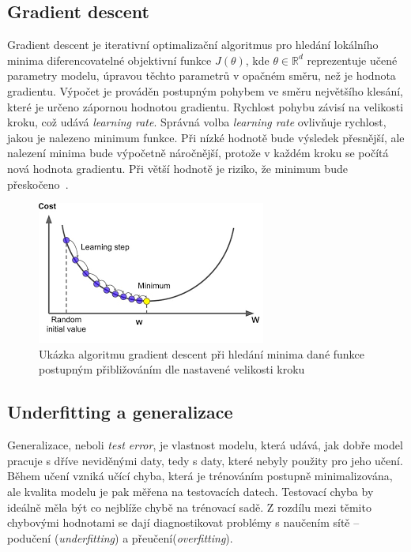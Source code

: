 \subsection*{Gradient descent}
Gradient descent je iterativní optimalizační algoritmus pro hledání lokálního minima diferencovatelné objektivní funkce $J(\theta)$, kde $\theta \in \mathbb{R}^d$ reprezentuje učené parametry modelu, úpravou těchto parametrů v opačném směru, než je hodnota gradientu. Výpočet je prováděn postupným pohybem ve směru největšího klesání, které je určeno zápornou hodnotou gradientu. Rychlost pohybu závisí na velikosti kroku, což udává \textit{learning rate}. Správná volba \textit{learning rate} ovlivňuje rychlost, jakou je nalezeno minimum funkce. Při nízké hodnotě bude výsledek přesnější, ale nalezení minima bude výpočetně náročnější, protože v každém kroku se počítá nová hodnota gradientu. Při větší hodnotě je riziko, že minimum bude přeskočeno~\cite{ruder2016overview}.
\begin{figure}[H]
    \centering
    \includegraphics[scale=0.7]{obrazky-figures/gradientdescent.png}
    \caption{\label{fig:gradientdescent}Ukázka algoritmu gradient descent při hledání minima dané funkce postupným přibližováním dle nastavené velikosti kroku}
\end{figure}




\subsection{Underfitting a generalizace}
Generalizace, neboli \textit{test error}, je vlastnost modelu, která udává, jak dobře model pracuje s dříve neviděnými daty, tedy s daty, které nebyly použity pro jeho učení. Během učení vzniká učící chyba, která je trénováním postupně minimalizována, ale kvalita modelu je pak měřena na testovacích datech. 
Testovací chyba by ideálně měla být co nejblíže chybě na trénovací sadě. Z rozdílu mezi těmito chybovými hodnotami se dají diagnostikovat problémy s naučením sítě -- podučení (\textit{underfitting}) a přeučení(\textit{overfitting}). 

